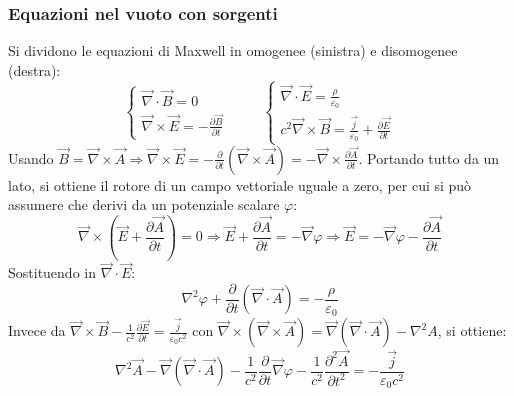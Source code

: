 \documentclass[a4paper]{scrartcl}
\numberwithin{equation}{subsection}
\theoremstyle{style1}
\begin{document}
\subsubsection{Equazioni nel vuoto con sorgenti}
Si dividono le equazioni di Maxwell in omogenee (sinistra) e disomogenee (destra):
\[
\begin{cases}
	\vec{\nabla }\cdot \vec{B}=0\\
	\vec{\nabla }\times \vec{E} = - \frac{\partial \vec{B}}{\partial t} 
	\end{cases}\hspace{1cm}\begin{cases}
	\vec{\nabla }\cdot \vec{E}=\frac{\rho}{\varepsilon_0}\\
	c^2 \vec{\nabla }\times \vec{B} = \frac{\vec{j}}{\varepsilon _0} + \frac{\partial \vec{E}}{\partial t} 
\end{cases}
\] 
Usando $\vec{B}= \vec{\nabla }\times \vec{A}\Rightarrow \vec{\nabla }\times \vec{E}= - \frac{\partial }{\partial t} (\vec{\nabla}\times \vec{A}) = - \vec{\nabla }\times \frac{\partial \vec{A}}{\partial t} $. Portando tutto da un lato, si ottiene il rotore di un campo vettoriale uguale a zero, per cui si pu\`o assumere che derivi da un potenziale scalare $\varphi $:
\begin{equation}
	\vec{\nabla }\times \left(\vec{E}+\frac{\partial \vec{A}}{\partial t} \right) =0\Rightarrow \vec{E}+\frac{\partial \vec{A}}{\partial t} = - \vec{\nabla }\varphi \Rightarrow \vec{E}= - \vec{\nabla }\varphi  - \frac{\partial \vec{A}}{\partial t} 
\end{equation}
Sostituendo in $\vec{\nabla}\cdot \vec{E}$:
\begin{equation}
	\nabla ^2 \varphi  + \frac{\partial }{\partial t} (\vec{\nabla }\cdot \vec{A}) = - \frac{\rho}{\varepsilon _0}
\end{equation}
Invece da $\vec{\nabla }\times \vec{B}- \frac{1}{c^2}\frac{\partial \vec{E}}{\partial t} = \frac{\vec{j}}{\varepsilon _0 c^2}$ con $\vec{\nabla }\times (\vec{\nabla }\times \vec{A}) = \vec{\nabla }(\vec{\nabla }\cdot \vec{A}) - \nabla ^2 A$, si ottiene:
\begin{equation}
\nabla ^2 \vec{A} - \vec{\nabla }(\vec{\nabla }\cdot \vec{A}) - \frac{1}{c^2 }\frac{\partial }{\partial t}  \vec{\nabla }\varphi - \frac{1}{c^2} \frac{\partial ^2 \vec{A}}{\partial t^2} = - \frac{\vec{j}}{\varepsilon _0 c^2}
\end{equation}
\end{document}
